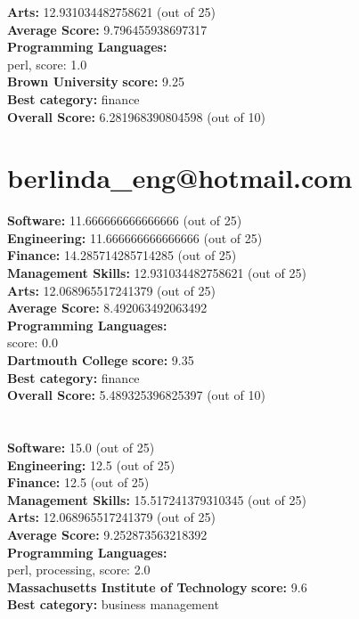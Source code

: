 \documentclass{article}
\begin{document}
\textbf{Arts:} 12.931034482758621 (out of 25)\\
\textbf{Average Score: } 9.796455938697317\\
\textbf{Programming Languages:} \\
perl, score: 1.0\\
\textbf{Brown University} \textbf{score:} 9.25\\
\textbf{Best category: } finance\\
\textbf{Overall Score: }6.281968390804598 (out of 10)\section{berlinda_eng@hotmail.com}
\textbf{Software:} 11.666666666666666 (out of 25)\\
\textbf{Engineering: } 11.666666666666666 (out of 25)\\
\textbf{Finance:} 14.285714285714285 (out of 25)\\
\textbf{Management Skills:} 12.931034482758621 (out of 25)\\
\textbf{Arts:} 12.068965517241379 (out of 25)\\
\textbf{Average Score: } 8.492063492063492\\
\textbf{Programming Languages:} \\
score: 0.0\\
\textbf{Dartmouth College} \textbf{score:} 9.35\\
\textbf{Best category: } finance\\
\textbf{Overall Score: }5.489325396825397 (out of 10)\section{}
\textbf{Software:} 15.0 (out of 25)\\
\textbf{Engineering: } 12.5 (out of 25)\\
\textbf{Finance:} 12.5 (out of 25)\\
\textbf{Management Skills:} 15.517241379310345 (out of 25)\\
\textbf{Arts:} 12.068965517241379 (out of 25)\\
\textbf{Average Score: } 9.252873563218392\\
\textbf{Programming Languages:} \\
perl, processing, score: 2.0\\
\textbf{Massachusetts Institute of Technology} \textbf{score:} 9.6\\
\textbf{Best category: } business management\\
\end{document}
